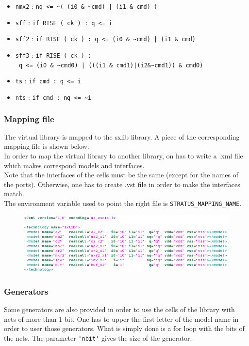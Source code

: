 \begin{itemize}
    \item \verb-nmx2- : \verb-nq <= ~( (i0 & ~cmd) | (i1 & cmd) )-
    \item \verb-sff- : \verb-if RISE ( ck ) : q <= i-
    \item \verb-sff2- : \verb-if RISE ( ck ) : q <= (i0 & ~cmd) | (i1 & cmd)-
    \item \verb-sff3- : \verb-if RISE ( ck ) :-\\\verb- q <= (i0 & ~cmd0) | (((i1 & cmd1)|(i2&~cmd1)) & cmd0)-
    \item \verb-ts- : \verb-if cmd : q <= i-
    \item \verb-nts- : \verb-if cmd : nq <= ~i-
\end{itemize}

\subsubsection{Mapping file}

The virtual library is mapped to the sxlib library. A piece of the corresponding mapping file is shown below.\\
\indent In order to map the virtual library to another library, on has to write a .xml file which makes correspond models and interfaces.\\
\indent Note that the interfaces of the cells must be the same (except for the names of the ports). Otherwise, one has to create .vst file in order to make the interfaces match.\\

\indent The environment variable used to point the right file is \verb-STRATUS_MAPPING_NAME-.

\begin{figure}[h!]
\includegraphics[width=1\textwidth]{images/xml.png}
\end{figure}

\subsubsection{Generators}

Some generators are also provided in order to use the cells of the library with nets of more than 1 bit. One has to upper the first letter of the model name in order to user those generators. What is simply done is a for loop with the bits of the nets. The parameter \verb-'nbit'- gives the size of the generator.


